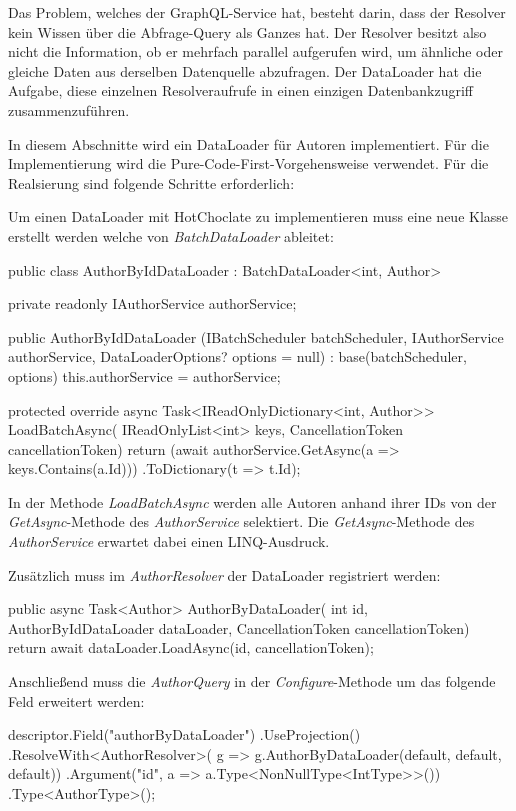 Das Problem, welches der GraphQL-Service hat, besteht darin, dass der Resolver kein Wissen über die Abfrage-Query als Ganzes hat.
Der Resolver besitzt also nicht die Information, ob er mehrfach parallel aufgerufen wird, um ähnliche oder gleiche Daten aus derselben Datenquelle abzufragen.
Der DataLoader hat die Aufgabe, diese einzelnen Resolveraufrufe in einen einzigen Datenbankzugriff zusammenzuführen.

In diesem Abschnitte wird ein DataLoader für Autoren implementiert.
Für die Implementierung wird die Pure-Code-First-Vorgehensweise verwendet.
Für die Realsierung sind folgende Schritte erforderlich:
\newline

Um einen DataLoader mit HotChoclate zu implementieren muss eine neue Klasse erstellt werden welche von \textit{BatchDataLoader} ableitet:
\begin{JsCode}
public class AuthorByIdDataLoader : BatchDataLoader<int, Author> {
    private readonly IAuthorService authorService;

    public AuthorByIdDataLoader
        (IBatchScheduler batchScheduler, IAuthorService authorService,
        DataLoaderOptions? options = null) : base(batchScheduler, options)
    {
        this.authorService = authorService;
    }

    protected override async Task<IReadOnlyDictionary<int, Author>> LoadBatchAsync(
        IReadOnlyList<int> keys, CancellationToken cancellationToken)
    {
        return (await authorService.GetAsync(a => keys.Contains(a.Id)))
               .ToDictionary(t => t.Id);
    }
}
\end{JsCode}
In der Methode \textit{LoadBatchAsync} werden alle Autoren anhand ihrer IDs von der \textit{GetAsync}-Methode des \textit{AuthorService} selektiert.
Die \textit{GetAsync}-Methode des \textit{AuthorService} erwartet dabei einen LINQ-Ausdruck.
\newline

Zusätzlich muss im \textit{AuthorResolver} der DataLoader registriert werden:
\begin{JsCode}
public async Task<Author> AuthorByDataLoader(
    int id,
    AuthorByIdDataLoader dataLoader,
    CancellationToken cancellationToken) 
{
    return await dataLoader.LoadAsync(id, cancellationToken);
}
\end{JsCode}

Anschließend muss die \textit{AuthorQuery} in der \textit{Configure}-Methode um das folgende Feld erweitert werden:
\begin{JsCode}
descriptor.Field("authorByDataLoader")
    .UseProjection()
    .ResolveWith<AuthorResolver>(
        g => g.AuthorByDataLoader(default, default, default))
    .Argument("id", a => a.Type<NonNullType<IntType>>())
    .Type<AuthorType>();
\end{JsCode}

